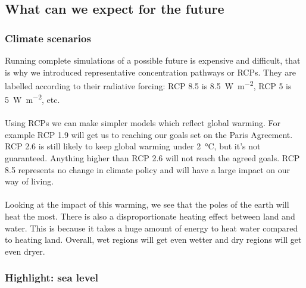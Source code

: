 \documentclass[../summary.tex]{subfiles}
\begin{document}
\subsection{What can we expect for the future}
\subsubsection{Climate scenarios}
Running complete simulations of a possible future is expensive and difficult, that is why we introduced representative concentration pathways or RCPs. They are labelled according to their radiative forcing: RCP 8.5 is \SI{8.5}{\watt\per\square\metre}, RCP 5 is \SI{5}{\watt\per\square\metre}, etc.
\\\\
Using RCPs we can make simpler models which reflect global warming. For example RCP 1.9 will get us to reaching our goals set on the Paris Agreement. RCP 2.6 is still likely to keep global warming under \SI{2}{\degreeCelsius}, but it's not guaranteed. Anything higher than RCP 2.6 will not reach the agreed goals. RCP 8.5 represents no change in climate policy and will have a large impact on our way of living.
\\\\
Looking at the impact of this warming, we see that the poles of the earth will heat the most. There is also a disproportionate heating effect between land and water. This is because it takes a huge amount of energy to heat water compared to heating land. Overall, wet regions will get even wetter and dry regions will get even dryer.

\newpage
\subsubsection{Highlight: sea level}
\end{document}
